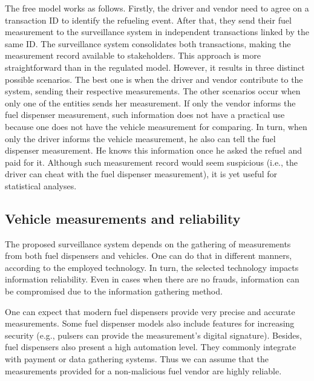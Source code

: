 \documentclass[sigplan]{acmart}
\begin{document}
The free model works as follows.
Firstly, the driver and vendor need to agree on a transaction ID to identify the refueling event. 
After that, they send their fuel measurement to the surveillance system in independent transactions linked by the same ID. 
The surveillance system consolidates both transactions, making the measurement record available to stakeholders.
This approach is more straightforward than in the regulated model.
However, it results in three distinct possible scenarios.
The best one is when the driver and vendor contribute to the system, sending their respective measurements.
The other scenarios occur when only one of the entities sends her measurement.
If only the vendor informs the fuel dispenser measurement, such information does not have a practical use because one does not have the vehicle measurement for comparing.
In turn, when only the driver informs the vehicle measurement, he also can tell the fuel dispenser measurement.
He knows this information once he asked the refuel and paid for it.
Although such measurement record would seem suspicious (i.e., the driver can cheat with the fuel dispenser measurement), it is yet useful for statistical analyses.

\subsection{Vehicle measurements and reliability}
The proposed surveillance system depends on the gathering of measurements from both fuel dispensers and vehicles.
One can do that in different manners, according to the employed technology.
In turn, the selected technology impacts information reliability.
Even in cases when there are no frauds, information can be compromised due to the information gathering method.

One can expect that modern fuel dispensers provide very precise and accurate measurements.
Some fuel dispenser models also include features for increasing security (e.g., pulsers can provide the measurement's digital signature).
Besides, fuel dispensers also present a high automation level.
They commonly integrate with payment or data gathering systems.
Thus we can assume that the measurements provided for a non-malicious fuel vendor are highly reliable.
\end{document}
